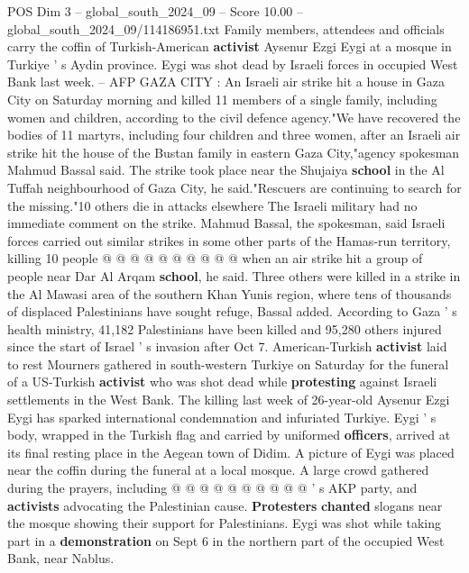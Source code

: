 \begin{textsample}{POS Dim 3 – global\_south\_2024\_09 – Score 10.00 – global\_south\_2024\_09/114186951.txt}  \label{ex:f3_pos_330}
Family members, attendees and officials carry the coffin of Turkish-American \textbf{activist} Aysenur Ezgi Eygi at a mosque in Turkiye ' s Aydin province.
Eygi was shot dead by Israeli forces in occupied West Bank last week. -- AFP GAZA CITY : An Israeli air strike hit a house in Gaza City on Saturday morning and killed 11 members of a single family, including women and children, according to the civil defence agency."We have recovered the bodies of 11 martyrs, including four children and three women, after an Israeli air strike hit the house of the Bustan family in eastern Gaza City,"agency spokesman Mahmud Bassal said.
The strike took place near the Shujaiya \textbf{school} in the Al Tuffah neighbourhood of Gaza City, he said."Rescuers are continuing to search for the missing."10 others die in attacks elsewhere The Israeli military had no immediate comment on the strike.
Mahmud Bassal, the spokesman, said Israeli forces carried out similar strikes in some other parts of the Hamas-run territory, killing 10 people @ @ @ @ @ @ @ @ @ @ when an air strike hit a group of people near Dar Al Arqam \textbf{school}, he said.
Three others were killed in a strike in the Al Mawasi area of the southern Khan Yunis region, where tens of thousands of displaced Palestinians have sought refuge, Bassal added.
According to Gaza ' s health ministry, 41,182 Palestinians have been killed and 95,280 others injured since the start of Israel ' s invasion after Oct 7.
American-Turkish \textbf{activist} laid to rest Mourners gathered in south-western Turkiye on Saturday for the funeral of a US-Turkish \textbf{activist} who was shot dead while \textbf{protesting} against Israeli settlements in the West Bank.
The killing last week of 26-year-old Aysenur Ezgi Eygi has sparked international condemnation and infuriated Turkiye.
Eygi ' s body, wrapped in the Turkish flag and carried by uniformed \textbf{officers}, arrived at its final resting place in the Aegean town of Didim.
A picture of Eygi was placed near the coffin during the funeral at a local mosque.
A large crowd gathered during the prayers, including @ @ @ @ @ @ @ @ @ @ ' s AKP party, and \textbf{activists} advocating the Palestinian cause. \textbf{Protesters} \textbf{chanted} slogans near the mosque showing their support for Palestinians.
Eygi was shot while taking part in a \textbf{demonstration} on Sept 6 in the northern part of the occupied West Bank, near Nablus.

\end{textsample}
